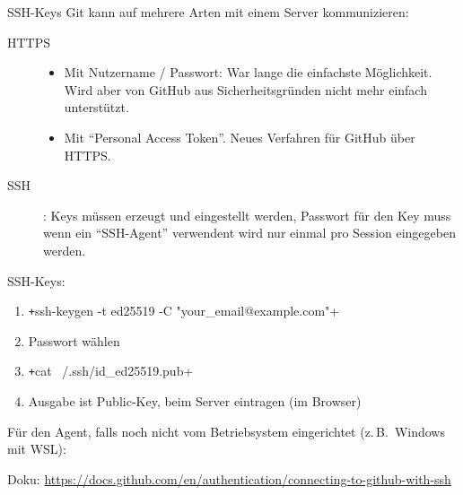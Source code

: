 \begin{frame}[fragile]{SSH-Keys}
  Git kann auf mehrere Arten mit einem Server kommunizieren:
  \begin{description}
    \item[HTTPS]
      \begin{itemize}
        \item Mit Nutzername / Passwort:
          War lange die einfachste Möglichkeit. Wird aber von GitHub aus Sicherheitsgründen nicht mehr einfach unterstützt.
        \item Mit \enquote{Personal Access Token}. Neues Verfahren für GitHub über HTTPS.
      \end{itemize}
    \item[SSH]: Keys müssen erzeugt und eingestellt werden, Passwort für den Key muss wenn ein \enquote{SSH-Agent} verwendent wird nur einmal pro Session eingegeben werden.
  \end{description}

  SSH-Keys:
  \begin{enumerate}
    \item \texttt+ssh-keygen -t ed25519 -C "your_email@example.com"+
    \item Passwort wählen
    \item \texttt+cat ~/.ssh/id_ed25519.pub+
    \item Ausgabe ist Public-Key, beim Server eintragen (im Browser)
  \end{enumerate}

  Für den Agent, falls noch nicht vom Betriebsystem eingerichtet (z.\,B.\ Windows mit WSL):

  Doku: \url{https://docs.github.com/en/authentication/connecting-to-github-with-ssh}
\end{frame}

